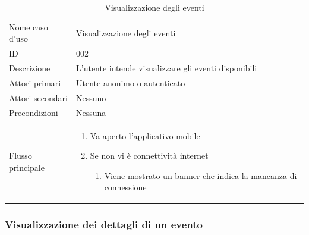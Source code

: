 \documentclass{article}
\begin{document}
\begin{table}[htbp]
    \centering
    \begin{tabularx}{\textwidth}{| l | p{} |}
        \Xhline{2pt} %
        Nome caso d'uso & Visualizzazione degli eventi \\
        \Xhline{2pt} %
        ID & 002 \\
        \hline
        Descrizione & L'utente intende visualizzare gli eventi disponibili\\
        \hline
        Attori primari & Utente anonimo o autenticato\\
        \hline
        Attori secondari & Nessuno \\
        \hline
        Precondizioni & Nessuna \\
        \hline
        Flusso principale & 
        \begin{enumerate}[topsep=5pt,partopsep=0pt,parsep=0pt,itemsep=0pt,before=\vspace{-\baselineskip},after=\vspace{-\baselineskip}]                
            \item Va aperto l'applicativo mobile
            \item Se non vi è connettività internet
            \begin{enumerate}[leftmargin=*, nosep]
                \item Viene mostrato un banner che indica la mancanza di connessione
            \end{enumerate}
        \end{enumerate}
        \\
        \hline
    \end{tabularx}
    \caption{Visualizzazione degli eventi}
    \label{tab:tabella_use_case002}
\end{table}

\subsubsection{Visualizzazione dei dettagli di un evento}
\end{document}
